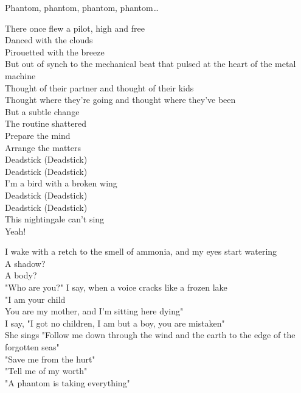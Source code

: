 Phantom, phantom, phantom, phantom…\\




There once flew a pilot, high and free\\
Danced with the clouds\\
Pirouetted with the breeze\\
But out of synch to the mechanical beat that pulsed at the heart of the metal machine\\
Thought of their partner and thought of their kids\\
Thought where they're going and thought where they've been\\
But a subtle change\\
The routine shattered\\
Prepare the mind\\
Arrange the matters\\

Deadstick (Deadstick)\\
Deadstick (Deadstick)\\
I'm a bird with a broken wing\\
Deadstick (Deadstick)\\
Deadstick (Deadstick)\\
This nightingale can't sing\\
Yeah!\\


I wake with a retch to the smell of ammonia, and my eyes start watering\\
A shadow?\\
A body?\\
"Who are you?" I say, when a voice cracks like a frozen lake\\
"I am your child\\
You are my mother, and I'm sitting here dying"\\
I say, "I got no children, I am but a boy, you are mistaken"\\

She sings "Follow me down through the wind and the earth to the edge of the forgotten seas"\\
"Save me from the hurt"\\
"Tell me of my worth"\\
"A phantom is taking everything"\\

